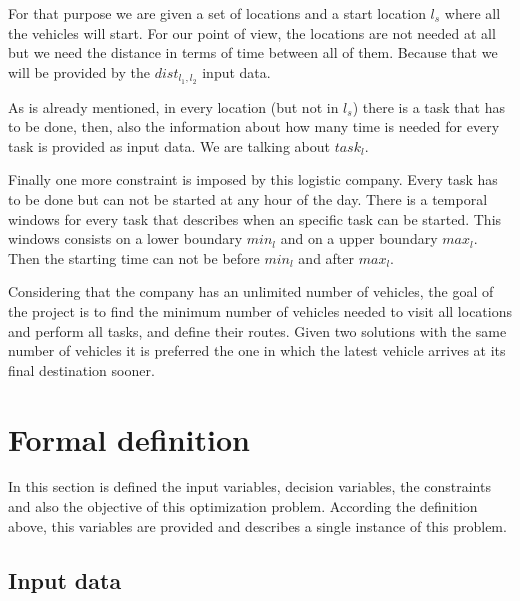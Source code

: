 \documentclass[]{report}
\begin{document}
For that purpose we are given a set of locations and a start location $l_{s}$ where all the vehicles will start. For our point of view, the locations are not needed at all but we need the distance in terms of time between all of them. Because that we will be provided by the $dist_{l_{1},l_{2}}$ input data.

As is already mentioned, in every location (but not in $l_{s}$) there is a task that has to be done, then, also the information about how many time is needed for every task is provided as input data. We are talking about $task_{l}$.

Finally one more constraint is imposed by this logistic company. Every task has to be done but can not be started at any hour of the day. There is a temporal windows for every task that describes when an specific task can be started. This windows consists on a lower boundary $min_{l}$ and on a upper boundary $max_{l}$. Then the starting time can not be before $min_{l}$ and after $max_{l}$.

Considering that the company has an unlimited number of vehicles, the goal of the project is to find the minimum number of vehicles needed to visit all locations and perform all tasks, and define their routes. Given two solutions with the same number of vehicles it is preferred the one in which the latest vehicle arrives at its final destination sooner.

\section{Formal definition}

In this section is defined the input variables, decision variables, the constraints and also the objective of this optimization problem.
According the definition above, this variables are provided and describes a single instance of this problem.

\subsection{Input data}
\end{document}

